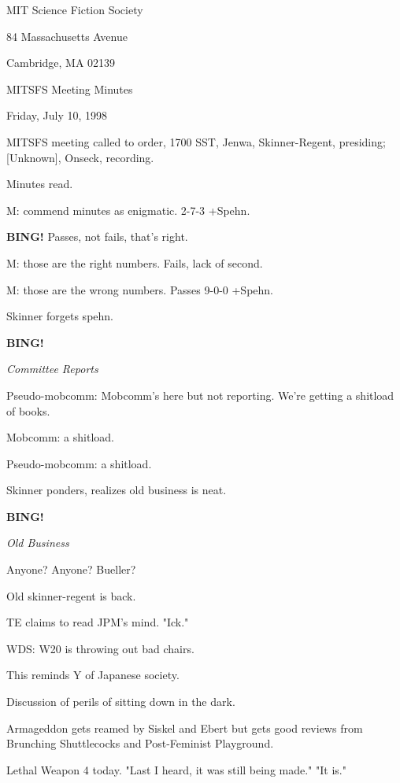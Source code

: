 \documentclass[12pt]{article}
\newcommand{\bing}{{\bf BING!} }
\newcommand{\goto}[1]{\bing \vskip 12pt \centerline{{\em{#1}}}}
\begin{document}
\begin{center}

MIT Science Fiction Society 

84 Massachusetts Avenue

Cambridge, MA 02139

\vspace{12pt}

MITSFS Meeting Minutes 

Friday, July 10, 1998

\end{center}
 
\vspace{18pt}

\setlength{\parskip}{6pt}

\noindent
MITSFS meeting called to order, 1700 SST,
Jenwa, Skinner-Regent, presiding; [Unknown], Onseck, recording.

Minutes read.

M: commend minutes as enigmatic. 2-7-3 +Spehn.

\bing Passes, not fails, that's right.

M: those are the right numbers. Fails, lack of second.

M: those are the wrong numbers. Passes 9-0-0 +Spehn.

Skinner forgets spehn.

\goto{Committee Reports}

Pseudo-mobcomm: Mobcomm's here but not reporting. We're getting a shitload of books.

Mobcomm: a shitload.

Pseudo-mobcomm: a shitload.

Skinner ponders, realizes old business is neat.

\goto{Old Business}

Anyone? Anyone? Bueller?

Old skinner-regent is back.

TE claims to read JPM's mind. "Ick."

WDS: W20 is throwing out bad chairs.

This reminds Y of Japanese society.

Discussion of perils of sitting down in the dark.

Armageddon gets reamed by Siskel and Ebert but gets good reviews from Brunching Shuttlecocks and Post-Feminist Playground.

Lethal Weapon 4 today. "Last I heard, it was still being made." "It is."
\end{document}
